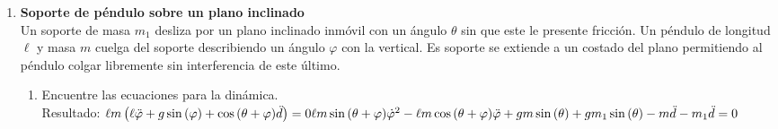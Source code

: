 \documentclass[11pt, a4paper, twoside]{article}
\begin{document}
\begin{enumerate}
\item
	\begin{minipage}[t][4.7cm]{0.7\textwidth}
		\textbf{Soporte de péndulo sobre un plano inclinado}\\
		Un soporte de masa \(m_1\) desliza por un plano inclinado inmóvil con un ángulo \(\theta\) sin que este le presente fricción.
		Un péndulo de longitud \(\ell\) y masa \(m\) cuelga del soporte describiendo un ángulo \(\varphi\) con la vertical.
		Es soporte se extiende a un costado del plano permitiendo al péndulo colgar libremente sin interferencia de este último.
		\begin{enumerate}
			\item Encuentre las ecuaciones para la dinámica.\\
			Resultado:
			\(
				\ell m \left(\ell \ddot{\varphi} + g \sin{\left(\varphi \right)} + \cos{\left(\theta + \varphi \right)} \ddot{d}\right) = 0 \\[5 pt]
				\ell m \sin{\left(\theta + \varphi \right)} \dot{\varphi}^{2} - \ell m \cos{\left(\theta + \varphi \right)} \ddot{\varphi} + g m \sin{\left(\theta \right)} + g m_{1} \sin{\left(\theta \right)} - m \ddot{d} - m_{1} \ddot{d} = 0
			\)
		\end{enumerate}
	\end{minipage}
	\begin{minipage}[c][0cm][t]{0.3\textwidth}
		
	\end{minipage}
	



\end{enumerate}
\end{document}
